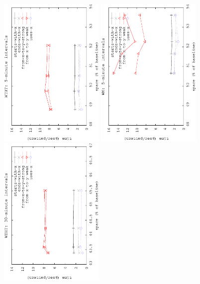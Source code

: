\begin{figure}[!ht]
		\begin{center}
			{\includegraphics[angle=-90,width=0.45\textwidth]{figures_synt/porto_ht5.eps}}
			{\includegraphics[angle=-90,width=0.45\textwidth]{figures_synt/porto_wm5.eps}}
			{\includegraphics[angle=-90,width=0.45\textwidth]{figures_synt/porto_ht30.eps}}

\end{center}
\end{figure}
